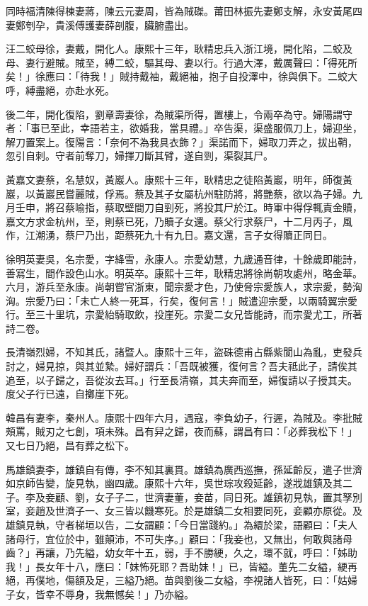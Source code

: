 \begin{pinyinscope}
同時福清陳得棟妻蔣，陳云元妻周，皆為賊磔。莆田林振先妻鄭支解，永安黃尾四妻鄭刳孕，貴溪傅護妻薛剖腹，臟腑盡出。

汪二蛟母徐，妻戴，開化人。康熙十三年，耿精忠兵入浙江境，開化陷，二蛟及母、妻行避賊。賊至，縛二蛟，驅其母、妻以行。行過大澤，戴厲聲曰：「得死所矣！」徐應曰：「待我！」賊持戴袖，戴絕袖，抱子自投澤中，徐與俱下。二蛟大呼，縛盡絕，亦赴水死。

後二年，開化復陷，劉章壽妻徐，為賊渠所得，置樓上，令兩卒為守。婦陽謂守者：「事已至此，幸語若主，欲婚我，當具禮。」卒告渠，渠盛服佩刀上，婦迎坐，解刀置案上。復陽言：「奈何不為我具衣飾？」渠諾而下，婦取刀弄之，拔出鞘，忽引自刺。守者前奪刀，婦揮刀斷其臂，遂自剄，渠裂其尸。

黃嘉文妻蔡，名慧奴，黃巖人。康熙十三年，耿精忠之徒陷黃巖，明年，師復黃巖，以黃巖民嘗麗賊，俘焉。蔡及其子女屬杭州駐防將，將艷蔡，欲以為子婦。九月壬申，將召蔡喻指，蔡取壁間刀自剄死，將投其尸於江。時軍中得俘輒責金贖，嘉文方求金杭州，至，則蔡已死，乃贖子女還。蔡父行求蔡尸，十二月丙子，風作，江潮湧，蔡尸乃出，距蔡死九十有九日。嘉文還，言子女得贖正同日。

徐明英妻吳，名宗愛，字絳雪，永康人。宗愛幼慧，九歲通音律，十餘歲即能詩，善寫生，間作設色山水。明英卒。康熙十三年，耿精忠將徐尚朝攻處州，略金華。六月，游兵至永康。尚朝嘗官浙東，聞宗愛才色，乃使脅宗愛族人，求宗愛，勢洶洶。宗愛乃曰：「未亡人終一死耳，行矣，復何言！」賊遣迎宗愛，以兩騎翼宗愛行。至三十里坑，宗愛紿騎取飲，投崖死。宗愛二女兄皆能詩，而宗愛尤工，所著詩二卷。

長清嶺烈婦，不知其氏，諸暨人。康熙十三年，盜硃德甫占縣紫閬山為亂，吏發兵討之，婦見掠，與其並縶。婦好謂兵：「吾既被獲，復何言？吾夫祗此子，請俟其追至，以子歸之，吾從汝去耳。」行至長清嶺，其夫奔而至，婦復請以子授其夫。度父子行已遠，自擲崖下死。

韓昌有妻李，秦州人。康熙十四年六月，遇寇，李負幼子，行遲，為賊及。李批賊頰罵，賊刃之七創，項未殊。昌有舁之歸，夜而蘇，謂昌有曰：「必葬我松下！」又七日乃絕，昌有葬之松下。

馬雄鎮妻李，雄鎮自有傳，李不知其裏貫。雄鎮為廣西巡撫，孫延齡反，遣子世濟如京師告變，旋見執，幽四歲。康熙十六年，吳世琮攻殺延齡，遂戕雄鎮及其二子。李及妾顧、劉，女子子二，世濟妻董，妾苗，同日死。雄鎮初見執，置其孥別室，妾趙及世濟子一、女三皆以饑寒死。於是雄鎮二女相要同死，妾顧亦原從。及雄鎮見執，守者梯垣以告，二女謂顧：「今日當踐約。」為繯於梁，語顧曰：「夫人諸母行，宜位於中，雖顛沛，不可失序。」顧曰：「我妾也，又無出，何敢與諸母齒？」再讓，乃先縊，幼女年十五，弱，手不勝綆，久之，環不就，呼曰：「姊助我！」長女年十八，應曰：「妹怖死耶？吾助妹！」已，皆縊。董先二女縊，綆再絕，再僕地，傷額及足，三縊乃絕。苗與劉後二女縊，李視諸人皆死，曰：「姑婦子女，皆幸不辱身，我無憾矣！」乃亦縊。


\end{pinyinscope}
